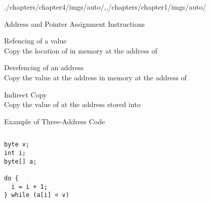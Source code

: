 \begin{graphicspathcontext}{{./chapters/chapter4/imgs/auto/},{./chapters/chapter1/imgs/auto/}}
\begin{bibunit}[apalike]
\begin{frame}{{Address and Pointer} Assignment Instructions}
	\begin{definitionblock}{Refencing of a value}
		\emph{} \\
		Copy the location of  in memory at the address of 
	\end{definitionblock}
	\vspace{.5cm}
	\begin{definitionblock}{Derefencing of an address}
		\emph{} \\
		Copy the value at the address  in memory at the address of 
	\end{definitionblock}
	\vspace{.5cm}
	\begin{definitionblock}{Indirect Copy}
		\emph{} \\
		Copy the value of  at the address stored into 
	\end{definitionblock}
\end{frame}

\begin{frame}[fragile,background=6]{Example of Three-Address Code}
	\larger\larger
	\begin{columns}
		\begin{column}{.45\linewidth}
			\centering
			\begin{lstlisting}[style=lststyle-java,basicstyle=\normalsize]
byte v;
int i;
byte[] a;

do {
  i = i + 1;
} while (a[i] < v)
			\end{lstlisting}
		\end{column}
		\begin{column}{.1\linewidth}
			\centering
		\end{column}
		\begin{column}{.45\linewidth}
			\begin{tac}[.7\linewidth]
			\end{tac}
		\end{column}
	\end{columns}
	\vspace{.5cm}
\end{frame}


\end{bibunit}
\end{graphicspathcontext}
